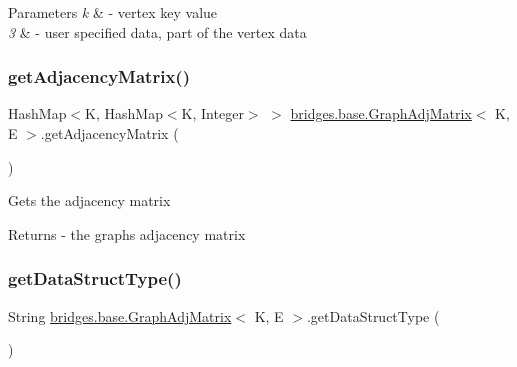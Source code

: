 \begin{DoxyParams}{Parameters}
{\em k} & -\/ vertex key value \\
\hline
{\em 3} & -\/ user specified data, part of the vertex data \\
\hline
\end{DoxyParams}
\hypertarget{classbridges_1_1base_1_1_graph_adj_matrix_a2bf0bf69333497b3b97788b74fe1f5b7}{}\label{classbridges_1_1base_1_1_graph_adj_matrix_a2bf0bf69333497b3b97788b74fe1f5b7} 
\subsubsection{\texorpdfstring{get\+Adjacency\+Matrix()}{getAdjacencyMatrix()}}
{\footnotesize\ttfamily Hash\+Map$<$K, Hash\+Map$<$K, Integer$>$ $>$ \hyperlink{classbridges_1_1base_1_1_graph_adj_matrix}{bridges.\+base.\+Graph\+Adj\+Matrix}$<$ K, E $>$.get\+Adjacency\+Matrix (\begin{DoxyParamCaption}{ }\end{DoxyParamCaption})}

Gets the adjacency matrix

\begin{DoxyReturn}{Returns}
-\/ the graph\textquotesingle{}s adjacency matrix 
\end{DoxyReturn}
\hypertarget{classbridges_1_1base_1_1_graph_adj_matrix_aa837a6bd0afbc700bf6277a062c5fdae}{}\label{classbridges_1_1base_1_1_graph_adj_matrix_aa837a6bd0afbc700bf6277a062c5fdae} 
\subsubsection{\texorpdfstring{get\+Data\+Struct\+Type()}{getDataStructType()}}
{\footnotesize\ttfamily String \hyperlink{classbridges_1_1base_1_1_graph_adj_matrix}{bridges.\+base.\+Graph\+Adj\+Matrix}$<$ K, E $>$.get\+Data\+Struct\+Type (\begin{DoxyParamCaption}{ }\end{DoxyParamCaption})}

